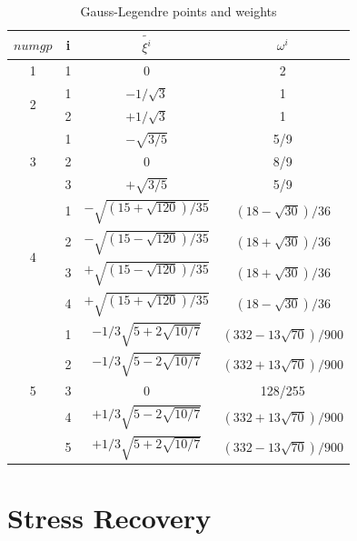 \begin{table}
	\begin{center}
		\caption{Gauss-Legendre points and weights}\label{tab: Gauss table}
		\begin{tabular}{cccc}
			$numgp$         & i & $\tilde{\xi^i}$ & $\omega^i$  \\ \hline
			1                           &1& 0 & 2   \\ \hline
			\multirow{2}{*}{2} &1& $-1/\sqrt{3}$ & 1   \\
			&2& $+1/\sqrt{3}$ & 1   \\ \hline
			\multirow{3}{*}{3} &1& $-\sqrt{3/5}$ &5/9 \\
			&2& 0                &8/9 \\
			&3& $+\sqrt{3/5}$ &5/9 \\ \hline
			\multirow{4}{*}{4}&1& $-\sqrt{\left(15+\sqrt{120}\right)/35}$ & $\left(18-\sqrt{30}\right)/36$ \\
			&2& $-\sqrt{\left(15-\sqrt{120}\right)/35}$ & $\left(18+\sqrt{30}\right)/36$ \\
			&3& $+\sqrt{\left(15-\sqrt{120}\right)/35}$ & $\left(18+\sqrt{30}\right)/36$ \\
			&4& $+\sqrt{\left(15+\sqrt{120}\right)/35}$ & $\left(18-\sqrt{30}\right)/36$ \\ \hline
			\multirow{5}{*}{5}&1& $-1/3\sqrt{5+2\sqrt{10/7}}$ & $\left(332-13\sqrt{70}\right)/900$ \\
			&2& $-1/3\sqrt{5-2\sqrt{10/7}}$ & $\left(332+13\sqrt{70}\right)/900$ \\
			&3& 0 & 128/255 \\
			&4& $+1/3\sqrt{5-2\sqrt{10/7}}$ & $\left(332+13\sqrt{70}\right)/900$ \\
			&5& $+1/3\sqrt{5+2\sqrt{10/7}}$ & $\left(332-13\sqrt{70}\right)/900$ \\ \hline
		\end{tabular}
	\end{center}	
\end{table}

\section{Stress Recovery}
